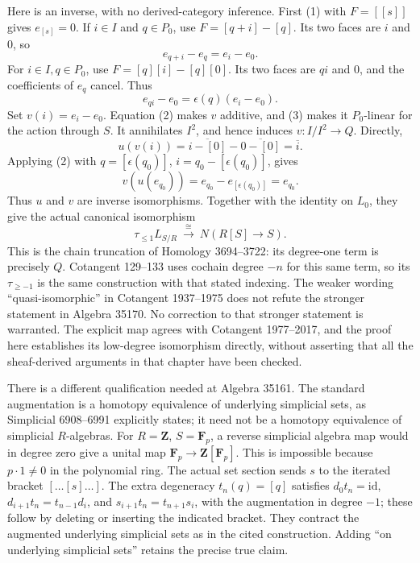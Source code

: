Here is an inverse, with no derived-category inference. First (1) with \(F=[[s]]\) gives \(e_{[s]}=0\). If \(i\in I\) and \(q\in P_0\), use \(F=[q+i]-[q]\). Its two faces are \(i\) and \(0\), so \[
e_{q+i}-e_q=e_i-e_0.\tag{2}
\] For \(i\in I,q\in P_0\), use \(F=[q][i]-[q][0]\). Its two faces are \(qi\) and \(0\), and the coefficients of \(e_q\) cancel. Thus \[
e_{qi}-e_0=\epsilon(q)(e_i-e_0).\tag{3}
\] Set \(v(i)=e_i-e_0\). Equation (2) makes \(v\) additive, and (3) makes it \(P_0\)-linear for the action through \(S\). It annihilates \(I^2\), and hence induces \(v:I/I^2\to Q\). Directly, \[
u(v(i))=\overline{i-[0]}-\overline{0-[0]}=\overline i.
\] Applying (2) with \(q=[\epsilon(q_0)]\), \(i=q_0-[\epsilon(q_0)]\), gives \[
v(u(e_{q_0}))=e_{q_0}-e_{[\epsilon(q_0)]}=e_{q_0}.
\] Thus \(u\) and \(v\) are inverse isomorphisms. Together with the identity on \(L_0\), they give the actual canonical isomorphism \[
\tau_{\leq1}L_{S/R}\ \xrightarrow{\ \cong\ }\ N(R[S]\to S).
\] This is the chain truncation of Homology 3694--3722: its degree-one term is precisely \(Q\). Cotangent 129--133 uses cochain degree \(-n\) for this same term, so its \(\tau_{\geq-1}\) is the same construction with that stated indexing. The weaker wording ``quasi-isomorphic'' in Cotangent 1937--1975 does not refute the stronger statement in Algebra 35170. No correction to that stronger statement is warranted. The explicit map agrees with Cotangent 1977--2017, and the proof here establishes its low-degree isomorphism directly, without asserting that all the sheaf-derived arguments in that chapter have been checked.

There is a different qualification needed at Algebra 35161. The standard augmentation is a homotopy equivalence of underlying simplicial sets, as Simplicial 6908--6991 explicitly states; it need not be a homotopy equivalence of simplicial \(R\)-algebras. For \(R=\mathbf Z\), \(S=\mathbf F_p\), a reverse simplicial algebra map would in degree zero give a unital map \(\mathbf F_p\to\mathbf Z[\mathbf F_p]\). This is impossible because \(p\cdot1\ne0\) in the polynomial ring. The actual set section sends \(s\) to the iterated bracket \([\ldots[s]\ldots]\). The extra degeneracy \(t_n(q)=[q]\) satisfies \(d_0t_n=\mathrm{id}\), \(d_{i+1}t_n=t_{n-1}d_i\), and \(s_{i+1}t_n=t_{n+1}s_i\), with the augmentation in degree \(-1\); these follow by deleting or inserting the indicated bracket. They contract the augmented underlying simplicial sets as in the cited construction. Adding ``on underlying simplicial sets'' retains the precise true claim.

